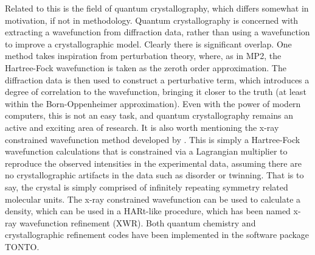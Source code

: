 \begin{refsection}
Related to this is the field of quantum crystallography, which differs somewhat in motivation, if not in methodology.
Quantum crystallography is concerned with extracting a wavefunction from diffraction data, rather than using a wavefunction to improve a crystallographic model.
Clearly there is significant overlap.
One method takes inspiration from perturbation theory, where, as in MP2, the Hartree-Fock wavefunction is taken as the zeroth order approximation.
The diffraction data is then used to construct a perturbative term, which introduces a degree of correlation to the wavefunction, bringing it closer to the truth (at least within the Born-Oppenheimer approximation).\autocite{Weiss1962}
Even with the power of modern computers, this is not an easy task, and quantum crystallography remains an active and exciting area of research.
It is also worth mentioning the x-ray constrained wavefunction method developed by \citeauthor{Grimwood2003}.\autocite{Grimwood2003}
This is simply a Hartree-Fock wavefunction calculations that is constrained via a Lagrangian multiplier to reproduce the observed intensities in the experimental data, assuming there are no crystallographic artifacts in the data such as disorder or twinning.
That is to say, the crystal is simply comprised of infinitely repeating symmetry related molecular units.
The x-ray constrained wavefunction can be used to calculate a density, which can be used in a HARt-like procedure, which has been named x-ray wavefunction refinement (XWR).\autocite{Woinska2017}
Both quantum chemistry and crystallographic refinement codes have been implemented in the software package TONTO.\autocite{Jayatilaka2003}


\end{refsection}
